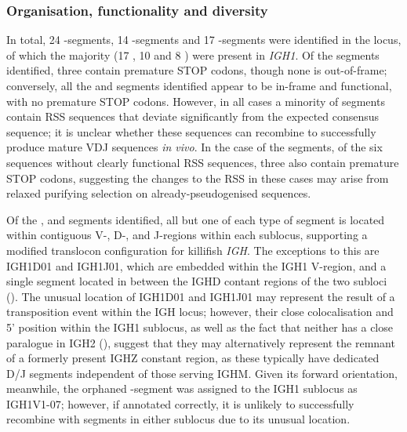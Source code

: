 	\subsubsection{Organisation, functionality and diversity}
	\label{sec:nfu-locus-variable-orga}
	 
	In total, 24 \vh-segments, 14 \dh-segments and 17 \jh-segments were identified in the \Nfu locus, of which the majority (17 \vh, 10 \dh and 8 \jh) were present in \textit{IGH1}. Of the \vh segments identified, three contain premature STOP codons, though none is out-of-frame; conversely, all the \dh and \jh segments identified appear to be in-frame and functional, with no premature STOP codons. However, in all cases a minority of segments contain RSS sequences that deviate significantly from the expected consensus sequence; it is unclear whether these sequences can recombine to successfully produce mature VDJ sequences \textit{in vivo}. In the case of the \vh segments, of the six sequences without clearly functional RSS sequences, three also contain premature STOP codons, suggesting the changes to the RSS in these cases may arise from relaxed purifying selection on already-pseudogenised sequences.
	
	Of the \vh, \dh and \jh segments identified, all but one of each type of segment is located within contiguous V-, D-, and J-regions within each sublocus, supporting a modified translocon configuration for killifish \textit{IGH}. The exceptions to this are IGH1D01 and IGH1J01, which are embedded within the IGH1 V-region, and a single \vh segment located in between the IGHD contant regions of the two subloci (). The unusual location of IGH1D01 and IGH1J01 may represent the result of a transposition event within the IGH locus; however, their close colocalisation and 5' position within the IGH1 sublocus, as well as the fact that neither has a close paralogue in IGH2 (), suggest that they may alternatively represent the remnant of a formerly present IGHZ constant region, as these typically have dedicated D/J segments independent of those serving IGHM. Given its forward orientation, meanwhile, the orphaned \vh-segment was assigned to the IGH1 sublocus as IGH1V1-07; however, if annotated correctly, it is unlikely to successfully recombine with segments in either sublocus due to its unusual location. %
		
